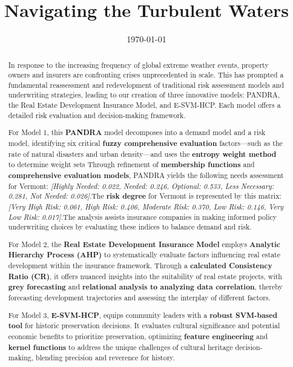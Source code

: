 \documentclass{mcmthesis}
\title{Navigating the Turbulent Waters}
\date{\today}
\begin{document}
\begin{abstract}
    \paragraph{ }In response to the increasing frequency of global extreme weather events, property owners and insurers are confronting crises unprecedented in scale. This has prompted a fundamental reassessment and redevelopment of traditional risk assessment models and underwriting strategies, leading to our creation of three innovative models: PANDRA, the Real Estate Development Insurance Model, and E-SVM-HCP. Each model offers a detailed risk evaluation and decision-making framework.

    For Model 1, this \textbf{PANDRA} model decomposes into a demand model and a risk model, identifying six critical \textbf{fuzzy comprehensive evaluation} factors—such as the rate of natural disasters and urban density—and uses the \textbf{entropy weight method} to determine weight sets Through refinement of \textbf{membership functions} and \textbf{comprehensive evaluation models}, PANDRA yields the following needs assessment for Vermont: \textit{[Highly Needed: 0.022, Needed: 0.246, Optional: 0.533, Less Necessary: 0.281, Not Needed: 0.026]}.The \textbf{risk degree} for Vermont is represented by this matrix:\textit{[Very High Risk: 0.061, High Risk: 0.406, Moderate Risk: 0.370, Low Risk: 0.146, Very Low Risk: 0.017]}.The analysis assists insurance companies in making informed policy underwriting choices by evaluating these indices to balance demand and risk.

    For Model 2, the \textbf{Real Estate Development Insurance Model} employs \textbf{Analytic Hierarchy Process (AHP)} to systematically evaluate factors influencing real estate development within the insurance framework. Through a \textbf{calculated Consistency Ratio (CR)}, it offers nuanced insights into the suitability of real estate projects, with \textbf{grey forecasting} and \textbf{relational analysis to analyzing data correlation}, thereby forecasting development trajectories and assessing the interplay of different factors.

    For Model 3, \textbf{E-SVM-HCP}, equips community leaders with a \textbf{robust SVM-based tool} for historic preservation decisions. It evaluates cultural significance and potential economic benefits to prioritize preservation, optimizing \textbf{feature engineering} and \textbf{kernel functions} to address the unique challenges of cultural heritage decision-making, blending precision and reverence for history.


\end{abstract}
\end{document}
